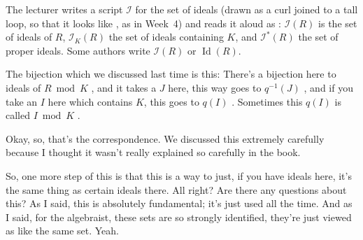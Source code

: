 \begin{aiNote}
The lecturer writes a script $\mathscr{I}$ for the set of ideals (drawn as a curl joined to a tall loop, so that it looks like , as in Week~4) and reads it aloud as : $\mathscr{I}(R)$ is the set of ideals of $R$, $\mathscr{I}_K(R)$ the set of ideals containing $K$, and $\mathscr{I}^*(R)$ the set of proper ideals. Some authors write $\mathcal{I}(R)$ or $\operatorname{Id}(R)$.
\end{aiNote}

\begin{speech}[00:01:36 - 00:02:37]
The bijection which we discussed last time is this: There's a bijection here to ideals of $R \bmod K$ , and it takes a $J$ here, this way goes to $q^{-1}(J)$ , and if you take an $I$ here which contains $K$, this goes to $q(I)$ . Sometimes this $q(I)$ is called $I \bmod K$ .

Okay, so, that's the correspondence. We discussed this extremely carefully because I thought it wasn't really explained so carefully in the book.

So, one more step of this is that this is a way to just, if you have ideals here, it's the same thing as certain ideals there. All right? Are there any questions about this? As I said, this is absolutely fundamental; it's just used all the time. And as I said, for the algebraist, these sets are so strongly identified, they're just viewed as like the same set. Yeah.
\end{speech}

\begin{content}
\end{content}

